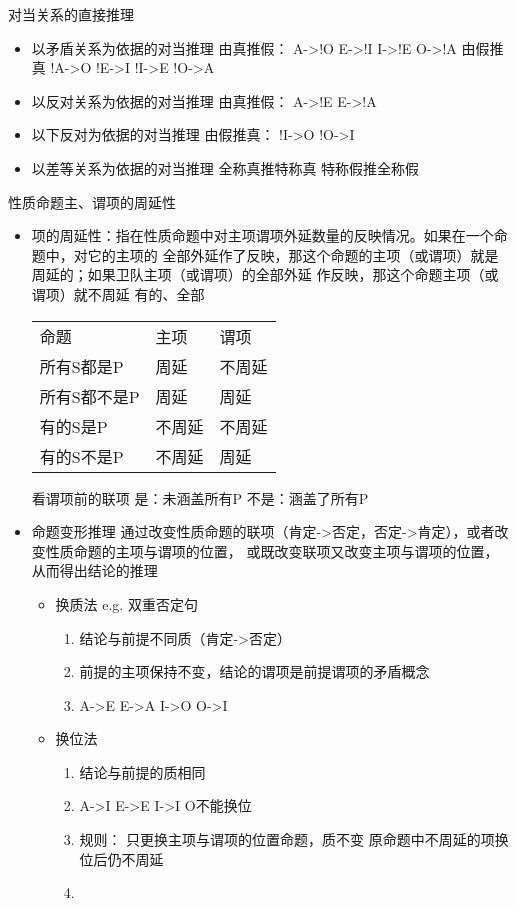 \documentclass[11pt]{article}
\begin{document}
\begin{description}
\item 对当关系的直接推理
\begin{itemize}
\item 以矛盾关系为依据的对当推理
由真推假：
A->!O E->!I I->!E O->!A
由假推真
!A->O !E->I !I->E !O->A
\item 以反对关系为依据的对当推理
由真推假：
A->!E E->!A
\item 以下反对为依据的对当推理
由假推真：
!I->O !O->I
\item 以差等关系为依据的对当推理
全称真推特称真
特称假推全称假
\end{itemize}
\item 性质命题主、谓项的周延性
\begin{itemize}
\item 项的周延性：指在性质命题中对主项谓项外延数量的反映情况。如果在一个命题中，对它的主项的
全部外延作了反映，那这个命题的主项（或谓项）就是周延的；如果卫队主项（或谓项）的全部外延
作反映，那这个命题主项（或谓项）就不周延
有的、全部
\begin{center}
\begin{tabular}{lll}
命题 & 主项 & 谓项\\
所有S都是P & 周延 & 不周延\\
所有S都不是P & 周延 & 周延\\
有的S是P & 不周延 & 不周延\\
有的S不是P & 不周延 & 周延\\
\end{tabular}
\end{center}
看谓项前的联项
是：未涵盖所有P 不是：涵盖了所有P
\end{itemize}
\item[{命题变形的直接推理}] \begin{itemize}
\item 命题变形推理
通过改变性质命题的联项（肯定->否定，否定->肯定），或者改变性质命题的主项与谓项的位置，
或既改变联项又改变主项与谓项的位置，从而得出结论的推理
\begin{itemize}
\item 换质法
e.g. 双重否定句
\begin{enumerate}
\item 结论与前提不同质（肯定->否定）
\item 前提的主项保持不变，结论的谓项是前提谓项的矛盾概念
\item A->E E->A I->O O->I
\end{enumerate}
\item 换位法
\begin{enumerate}
\item 结论与前提的质相同
\item A->I E->E I->I O不能换位
\item 规则：
只更换主项与谓项的位置命题，质不变
原命题中不周延的项换位后仍不周延
\item
\end{enumerate}
\end{itemize}
\end{itemize}
\end{description}
\end{document}
